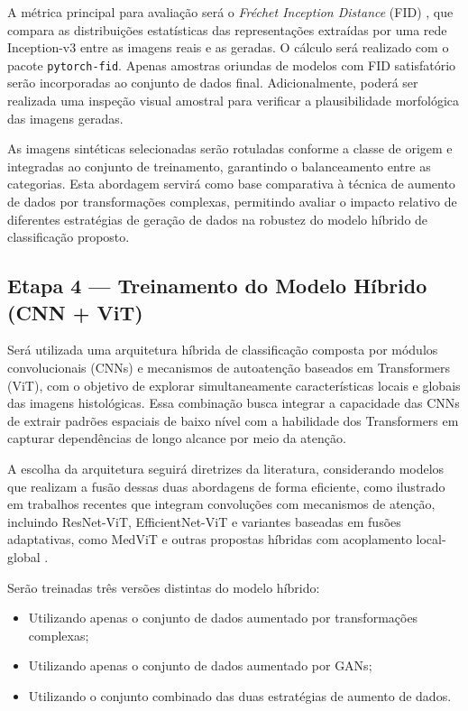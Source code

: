 A métrica principal para avaliação será o \textit{Fréchet Inception Distance} (FID) \cite{heusel2018ganstrainedtimescaleupdate}, que compara as distribuições estatísticas das representações extraídas por uma rede Inception-v3 entre as imagens reais e as geradas. O cálculo será realizado com o pacote \texttt{pytorch-fid}. Apenas amostras oriundas de modelos com FID satisfatório serão incorporadas ao conjunto de dados final. Adicionalmente, poderá ser realizada uma inspeção visual amostral para verificar a plausibilidade morfológica das imagens geradas.

As imagens sintéticas selecionadas serão rotuladas conforme a classe de origem e integradas ao conjunto de treinamento, garantindo o balanceamento entre as categorias. Esta abordagem servirá como base comparativa à técnica de aumento de dados por transformações complexas, permitindo avaliar o impacto relativo de diferentes estratégias de geração de dados na robustez do modelo híbrido de classificação proposto.


\subsection{Etapa 4 — Treinamento do Modelo Híbrido (CNN + ViT)}

Será utilizada uma arquitetura híbrida de classificação composta por módulos convolucionais (CNNs) e mecanismos de autoatenção baseados em Transformers (ViT), com o objetivo de explorar simultaneamente características locais e globais das imagens histológicas. Essa combinação busca integrar a capacidade das CNNs de extrair padrões espaciais de baixo nível com a habilidade dos Transformers em capturar dependências de longo alcance por meio da atenção.

A escolha da arquitetura seguirá diretrizes da literatura, considerando modelos que realizam a fusão dessas duas abordagens de forma eficiente, como ilustrado em trabalhos recentes que integram convoluções com mecanismos de atenção, incluindo ResNet-ViT, EfficientNet-ViT e variantes baseadas em fusões adaptativas, como MedViT e outras propostas híbridas com acoplamento local-global \cite{peng2021conformerlocalfeaturescoupling, hussain2025effresnet, chen2023medvit}.

Serão treinadas três versões distintas do modelo híbrido:
\begin{itemize}
    \item Utilizando apenas o conjunto de dados aumentado por transformações complexas;
    \item Utilizando apenas o conjunto de dados aumentado por GANs;
    \item Utilizando o conjunto combinado das duas estratégias de aumento de dados.
\end{itemize}

